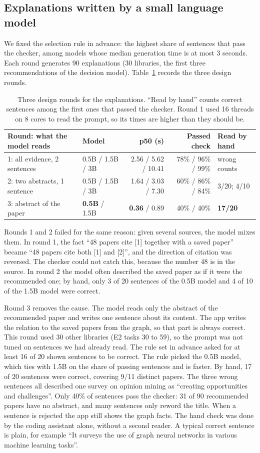\documentclass[11pt,a4paper]{article}
\begin{document}
\subsection{Explanations written by a small language model}\label{sec:slm}
We fixed the selection rule in advance: the highest share of sentences that pass the checker, among models whose median generation time is at most 3 seconds. Each round generates 90 explanations (30 libraries, the first three recommendations of the decision model). Table~\ref{tab:slm} records the three design rounds.
\begin{table}[htbp]\centering\footnotesize
\begin{tabular}{@{}llrrl@{}}\toprule
Round: what the model reads & Model & p50 (s) & Passed check & Read by hand\\\midrule
1: all evidence, 2 sentences & 0.5B / 1.5B / 3B & 2.56 / 5.62 / 10.41 & 78\% / 96\% / 99\% & wrong counts\\
2: two abstracts, 1 sentence & 0.5B / 1.5B / 3B & 1.64 / 3.03 / 7.30 & 60\% / 86\% / 84\% & 3/20; 4/10\\
3: abstract of the paper & \textbf{0.5B} / 1.5B & \textbf{0.36} / 0.89 & 40\% / 40\% & \textbf{17/20}\\\bottomrule
\end{tabular}\caption{Three design rounds for the explanations. ``Read by hand'' counts correct sentences among the first ones that passed the checker. Round 1 used 16 threads on 8 cores to read the prompt, so its times are higher than they should be.}\label{tab:slm}\end{table}

Rounds 1 and 2 failed for the same reason: given several sources, the model mixes them. In round 1, the fact ``48 papers cite [1] together with a saved paper'' became ``48 papers cite both [1] and [2]'', and the direction of citation was reversed. The checker could not catch this, because the number 48 is in the source. In round 2 the model often described the saved paper as if it were the recommended one; by hand, only 3 of 20 sentences of the 0.5B model and 4 of 10 of the 1.5B model were correct.

Round 3 removes the cause. The model reads only the abstract of the recommended paper and writes one sentence about its content. The app writes the relation to the saved papers from the graph, so that part is always correct. This round used 30 other libraries (E2 tasks 30 to 59), so the prompt was not tuned on sentences we had already read. The rule set in advance asked for at least 16 of 20 shown sentences to be correct. The rule picked the 0.5B model, which ties with 1.5B on the share of passing sentences and is faster. By hand, 17 of 20 sentences were correct, covering 9/11 distinct papers. The three wrong sentences all described one survey on opinion mining as ``creating opportunities and challenges''. Only 40\% of sentences pass the checker: 31 of 90 recommended papers have no abstract, and many sentences only reword the title. When a sentence is rejected the app still shows the graph facts. The hand check was done by the coding assistant alone, without a second reader. A typical correct sentence is plain, for example ``It surveys the use of graph neural networks in various machine learning tasks''.
\end{document}
